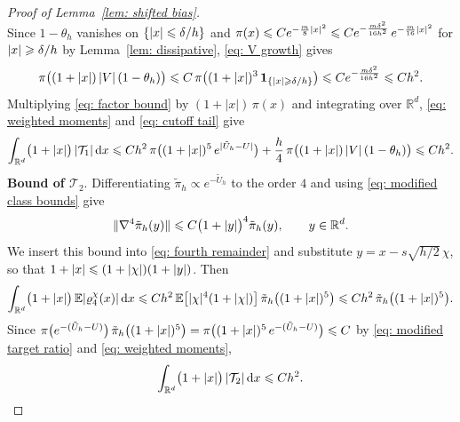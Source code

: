 \begin{proof}[Proof of Lemma~\ref{lem: shifted bias}]
\begin{equation}
    \end{equation}
    Since $1 - \theta_h$ vanishes on $\{|x| \leqslant \delta/h\}$ and $\pi(x) \leqslant C e^{-\frac{m}{8}|x|^2} \leqslant C e^{-\frac{m \delta^2}{16 h^2}}\, e^{-\frac{m}{16}|x|^2}$ for $|x| \geqslant \delta/h$ by Lemma~\ref{lem: dissipative}, \eqref{eq: V growth} gives
    \begin{equation}
        \pi\bigl( (1+|x|)\, |V|\, (1 - \theta_h) \bigr) \leqslant C\, \pi\bigl( (1+|x|)^3\, \mathbf 1_{\{|x| \geqslant \delta/h\}} \bigr) \leqslant C e^{-\frac{m \delta^2}{16 h^2}} \leqslant C h^2 .
        \label{eq: cutoff tail}
    \end{equation}
    Multiplying \eqref{eq: factor bound} by $(1+|x|)\, \pi(x)$ and integrating over $\mathbb R^d$, \eqref{eq: weighted moments} and \eqref{eq: cutoff tail} give
    \begin{equation}
        \int_{\mathbb R^d} \bigl( 1 + |x| \bigr)\, |\mathcal T_1| \,\mathrm{d} x \leqslant C h^2\, \pi\bigl( (1+|x|)^5\, e^{|\tilde U_h - U|} \bigr) + \frac h4\, \pi\bigl( (1+|x|)\, |V|\, (1 - \theta_h) \bigr) \leqslant C h^2 .
        \label{eq: factor integral}
    \end{equation}
    \textbf{Bound of $\mathcal T_2$}. Differentiating $\tilde\pi_h \propto e^{-\tilde U_h}$ to the order $4$ and using \eqref{eq: modified class bounds} give
    \begin{equation*}
        \lVert \nabla^4 \tilde\pi_h(y) \rVert \leqslant C \bigl( 1 + |y| \bigr)^4 \tilde\pi_h(y) , \qquad y \in \mathbb R^d .
    \end{equation*}
    We insert this bound into \eqref{eq: fourth remainder} and substitute $y = x - s\sqrt{h/2}\,\chi$, so that $1 + |x| \leqslant (1 + |\chi|)(1 + |y|)$. Then
    \begin{equation*}
        \int_{\mathbb R^d} \bigl( 1 + |x| \bigr)\, \mathbb E|\varrho_4^{\chi}(x)| \,\mathrm{d} x
        \leqslant C h^2\, \mathbb E\bigl[ |\chi|^4 (1+|\chi|) \bigr]\, \tilde\pi_h\bigl( (1+|x|)^5 \bigr) \leqslant C h^2\, \tilde\pi_h\bigl( (1+|x|)^5 \bigr) .
    \end{equation*}
    Since $\pi\bigl( e^{-(\tilde U_h - U)} \bigr)\, \tilde\pi_h\bigl( (1+|x|)^5 \bigr) = \pi\bigl( (1+|x|)^5\, e^{-(\tilde U_h - U)} \bigr) \leqslant C$ by \eqref{eq: modified target ratio} and \eqref{eq: weighted moments},
    \begin{equation}
        \int_{\mathbb R^d} \bigl( 1 + |x| \bigr)\, |\mathcal T_2| \,\mathrm{d} x \leqslant C h^2 .
        \label{eq: remainder integral}
    \end{equation}


\end{proof}
